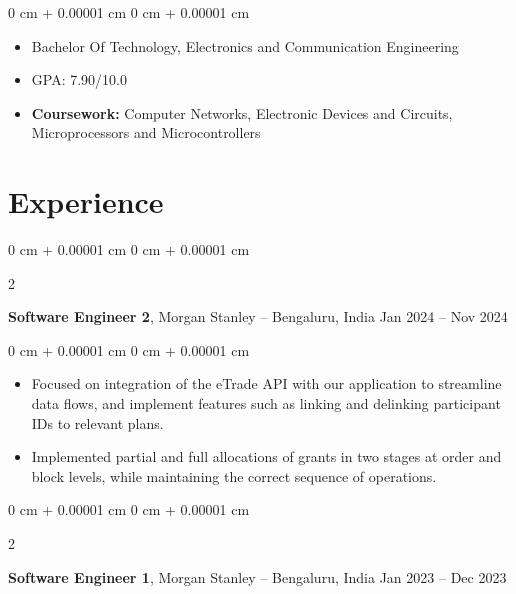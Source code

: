 \documentclass[30pt, a4paper]{article}
\newenvironment{highlights}{
    \begin{itemize}[
        topsep=0.10 cm,
        parsep=0.10 cm,
        partopsep=0pt,
        itemsep=0pt,
        leftmargin=0 cm + 10pt
    ]
}{
    \end{itemize}
} %
\newenvironment{onecolentry}{
    \begin{adjustwidth}{
        0 cm + 0.00001 cm
    }{
        0 cm + 0.00001 cm
    }
}{
    \end{adjustwidth}
} %
\newenvironment{twocolentry}[2][]{
    \onecolentry
    \def\secondColumn{#2}
    \setcolumnwidth{\fill, 4.5 cm}
    \begin{paracol}{2}
}{
    \switchcolumn \raggedleft \secondColumn
    \end{paracol}
    \endonecolentry
} %
\begin{document}
        \vspace{0.10 cm}
        \begin{onecolentry}
            \begin{highlights}
                \item Bachelor Of Technology, Electronics and Communication Engineering
                \item GPA: 7.90/10.0 
                \item \textbf{Coursework:} Computer Networks, Electronic Devices and Circuits, Microprocessors and Microcontrollers
            \end{highlights}
        \end{onecolentry}


    
    \section{Experience}



        
        \begin{twocolentry}{
            Jan 2024 – Nov 2024
        }
            \textbf{Software Engineer 2}, Morgan Stanley -- Bengaluru, India\end{twocolentry}

        \vspace{0.10 cm}
        \begin{onecolentry}
            \begin{highlights}
                \item Focused on integration of the eTrade API with our application to streamline data flows, and implement features such as linking and delinking participant IDs to relevant plans.
                \item Implemented partial and full allocations of grants in two stages at order and block levels, while maintaining the correct sequence of operations.
            \end{highlights}
        \end{onecolentry}


        \vspace{0.2 cm}

        \begin{twocolentry}{
            Jan 2023 – Dec 2023
        }
            \textbf{Software Engineer 1}, Morgan Stanley -- Bengaluru, India\end{twocolentry}
\end{document}
